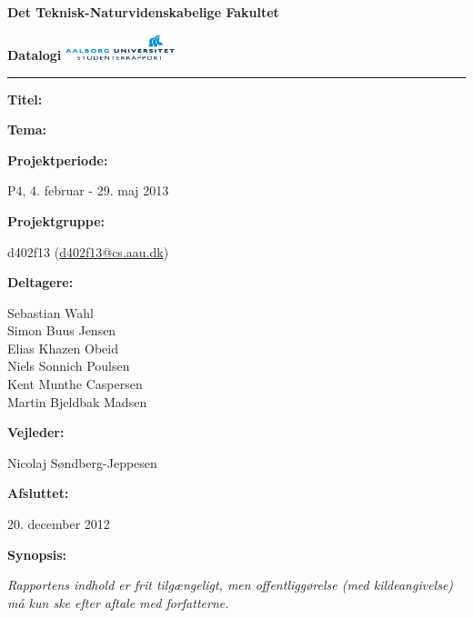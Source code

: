 \begin{nopagebreak}
\LARGE{\textbf{Det Teknisk-Naturvidenskabelige Fakultet}}\vspace{-0.9cm}

\large{\textbf{Datalogi}}
\hspace{10.5cm}\includegraphics[height=0.75cm]{pictures/aau_logo.pdf}


\hrule

\newcommand{\titleitem}[2]{\textbf{#1:}

\hspace*{0.5cm}
\begin{minipage}{0.9\columnwidth}#2\end{minipage}
\vspace{0.25cm}}
\begin{multicols}{2}

  \titleitem{Titel}{}

\titleitem{Tema}{}

\titleitem{Projektperiode}{P4, 4. februar - 29. maj 2013}

\titleitem{Projektgruppe}{d402f13 (\url{d402f13@cs.aau.dk})}

\titleitem{Deltagere}{
    Sebastian Wahl\\
    Simon Buus Jensen\\
    Elias Khazen Obeid\\
    Niels Sonnich Poulsen\\
    Kent Munthe Caspersen\\
    Martin Bjeldbak Madsen
}

\titleitem{Vejleder}{Nicolaj Søndberg-Jeppesen}

\titleitem{Afsluttet}{20. december 2012}

\vfill
\columnbreak

\titleitem{Synopsis}{ }

\end{multicols}
\centering
\textit{Rapportens indhold er frit tilgængeligt, men offentliggørelse (med kildeangivelse) må kun ske efter aftale med
forfatterne.}

\end{nopagebreak}
